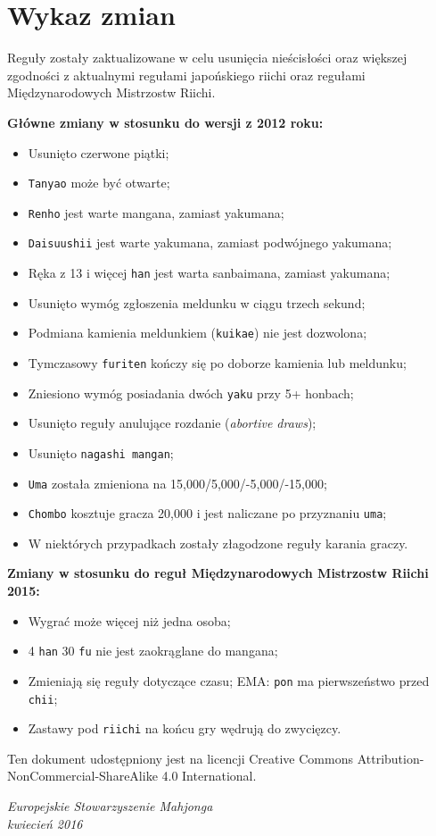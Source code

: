 \section*{Wykaz zmian}

Reguły zostały zaktualizowane w celu usunięcia nieścisłości oraz większej zgodności z aktualnymi regułami japońskiego riichi oraz regułami Międzynarodowych Mistrzostw Riichi.

\textbf{Główne zmiany w stosunku do wersji z 2012 roku:}
\begin{itemize}
    \item Usunięto czerwone piątki;
    \item \texttt{Tanyao} może być otwarte;
    \item \texttt{Renho} jest warte mangana, zamiast yakumana;
    \item \texttt{Daisuushii} jest warte yakumana, zamiast podwójnego yakumana;
    \item Ręka z 13 i więcej \texttt{han} jest warta sanbaimana, zamiast yakumana;
    \item Usunięto wymóg zgłoszenia meldunku w ciągu trzech sekund;
    \item Podmiana kamienia meldunkiem (\texttt{kuikae}) nie jest dozwolona;
    \item Tymczasowy \texttt{furiten} kończy się po doborze kamienia lub meldunku;
    \item Zniesiono wymóg posiadania dwóch \texttt{yaku} przy 5+ honbach;
    \item Usunięto reguły anulujące rozdanie (\emph{abortive draws});
    \item Usunięto \texttt{nagashi mangan};
    \item \texttt{Uma} została zmieniona na 15,000/5,000/-5,000/-15,000;
    \item \texttt{Chombo} kosztuje gracza 20,000 i jest naliczane po przyznaniu \texttt{uma};
    \item W niektórych przypadkach zostały złagodzone reguły karania graczy.
\end{itemize}

\textbf{Zmiany w stosunku do reguł Międzynarodowych Mistrzostw Riichi 2015:}
\begin{itemize}
    \item Wygrać może więcej niż jedna osoba;
    \item 4 \texttt{han} 30 \texttt{fu} nie jest zaokrąglane do mangana;
    \item Zmieniają się reguły dotyczące czasu; EMA: \texttt{pon} ma pierwszeństwo przed \texttt{chii};
    \item Zastawy pod \texttt{riichi} na końcu gry wędrują do zwycięzcy.
\end{itemize}

Ten dokument udostępniony jest na licencji Creative Commons Attribution-NonCommercial-ShareAlike 4.0 International.

\begin{flushright}
  \emph{
    Europejskie Stowarzyszenie Mahjonga \\
    kwiecień 2016
  }
\end{flushright}